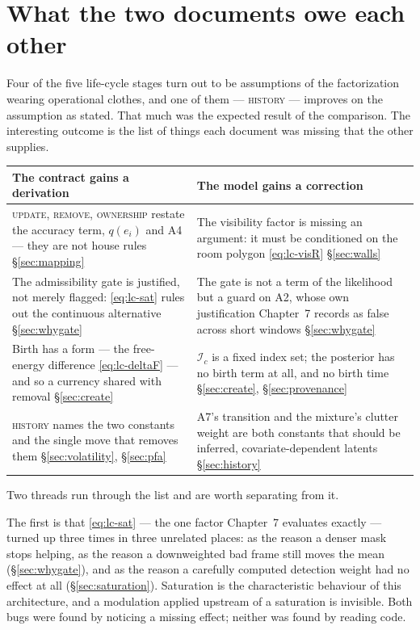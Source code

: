 \documentclass[11pt,a4paper]{report}
\newcommand{\stage}[1]{\textsc{#1}}
\newcommand{\Update}{\stage{update}}
\newcommand{\Remove}{\stage{remove}}
\newcommand{\History}{\stage{history}}
\newcommand{\Ownership}{\stage{ownership}}
\begin{document}
\section{What the two documents owe each other}
\label{sec:summary}

Four of the five life-cycle stages turn out to be assumptions of the factorization wearing
operational clothes, and one of them --- \History{} --- improves on the assumption as stated. That
much was the expected result of the comparison. The interesting outcome is the list of things each
document was missing that the other supplies.

\begin{center}
\begin{tabular}{@{}p{6.6cm} p{7.6cm}@{}}
\toprule
The contract gains a derivation & The model gains a correction \\
\midrule
\Update, \Remove, \Ownership{} restate the accuracy term, $q(e_i)$ and A4 --- they are not house
rules \S\ref{sec:mapping} &
The visibility factor is missing an argument: it must be conditioned on the room polygon
\eqref{eq:lc-visR} \S\ref{sec:walls} \\[5pt]
The admissibility gate is justified, not merely flagged: \eqref{eq:lc-sat} rules out the continuous
alternative \S\ref{sec:whygate} &
The gate is not a term of the likelihood but a guard on A2, whose own justification Chapter~7
records as false across short windows \S\ref{sec:whygate} \\[5pt]
Birth has a form --- the free-energy difference \eqref{eq:lc-deltaF} --- and so a currency shared
with removal \S\ref{sec:create} &
$\mathcal{I}_c$ is a fixed index set; the posterior has no birth term at all, and no birth time
\S\ref{sec:create}, \S\ref{sec:provenance} \\[5pt]
\History{} names the two constants and the single move that removes them
\S\ref{sec:volatility}, \S\ref{sec:pfa} &
A7's transition and the mixture's clutter weight are both constants that should be inferred,
covariate-dependent latents \S\ref{sec:history} \\
\bottomrule
\end{tabular}
\end{center}

\noindent
Two threads run through the list and are worth separating from it.

The first is that \eqref{eq:lc-sat} --- the one factor Chapter~7 evaluates exactly --- turned up
three times in three unrelated places: as the reason a denser mask stops helping, as the reason a
downweighted bad frame still moves the mean (\S\ref{sec:whygate}), and as the reason a carefully
computed detection weight had no effect at all (\S\ref{sec:saturation}). Saturation is the
characteristic behaviour of this architecture, and a modulation applied upstream of a saturation is
invisible. Both bugs were found by noticing a missing effect; neither was found by reading code.
\end{document}
